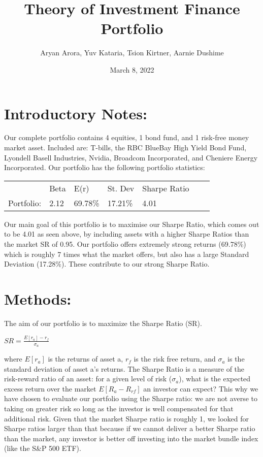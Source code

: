 \documentclass{article}
\begin{document}
\title{Theory of Investment Finance Portfolio} 
\author{Aryan Arora, Yuv Kataria, Tsion Kirtner, Aarnie Dushime}
\date{March 8, 2022}

\maketitle

\section{Introductory Notes:}

Our complete portfolio contains 4 equities, 1 bond fund, and 1 risk-free money market asset. Included are: T-bills, the RBC BlueBay High Yield Bond Fund, Lyondell Basell Industries, Nvidia, Broadcom Incorporated, and Cheniere Energy Incorporated. Our portfolio has the following portfolio statistics: 

\begin{table}[H]
\centering
\begin{tabular}{lllllll}
           & Beta & E(r)    & St. Dev & Sharpe Ratio  \\
Portfolio: & 2.12 & 69.78\% & 17.21\% & 4.01         
\end{tabular}
\end{table}

Our main goal of this portfolio is to maximise our Sharpe Ratio, which comes out to be 4.01 as seen above, by including assets with a higher Sharpe Ratios than the market SR of 0.95. Our portfolio offers extremely strong returns (69.78\%) which is roughly 7 times what the market offers, but also has a large Standard Deviation (17.28\%). These contribute to our strong Sharpe Ratio.

\section{Methods:}

The aim of our portfolio is to maximize the Sharpe Ratio (SR). 

\begin{center}
    \begin{math}
        SR = \frac{E[r_{a}]-r_f}{\sigma_{a}}
    \end{math}
\end{center}

where $E[r_{a}]$ is the returns of asset a, $r_f$ is the risk free return, and $\sigma_{a}$ is the standard deviation of asset a's returns. The Sharpe Ratio is a measure of the risk-reward ratio of an asset: for a given level of risk ($\sigma_{a}$), what is the expected excess return over the market $E[R_{a}-R_{rf}]$ an investor can expect? This why we have chosen to evaluate our portfolio using the Sharpe ratio: we are not averse to taking on greater risk so long as the investor is well compensated for that additional risk. Given that the market Sharpe ratio is roughly 1, we looked for Sharpe ratios larger than that because if we cannot deliver a better Sharpe ratio than the market, any investor is better off investing into the market bundle index (like the S\&P 500 ETF). 
\end{document}
